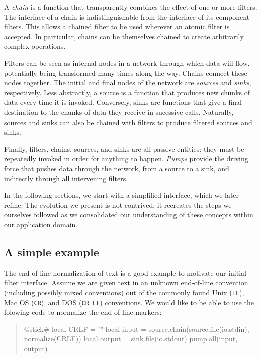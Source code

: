 \documentclass[10pt]{article}
\newcommand{\CR}{\texttt{CR}}
\newcommand{\LF}{\texttt{LF}}
\newcommand{\CRLF}{\texttt{CR~LF}}
\begin{document}
A \emph{chain} is a function that transparently combines the
effect of one or more filters. The interface of a chain is
indistinguishable from the interface of its component
filters.  This  allows a chained filter to be used wherever
an atomic filter is accepted. In particular, chains can be
themselves chained to create arbitrarily complex operations.

Filters can be seen as internal nodes in a network through
which data will flow, potentially being transformed many
times along the way.  Chains connect these nodes together.
The initial and final nodes of the network are
\emph{sources} and \emph{sinks}, respectively.  Less
abstractly, a source is a function that produces new chunks
of data every time it is invoked.  Conversely, sinks are
functions that give a final destination to the chunks of
data they receive in sucessive calls.  Naturally, sources
and sinks can also be chained with filters to produce
filtered sources and sinks.

Finally, filters, chains, sources, and sinks are all passive
entities: they must be repeatedly invoked in order for
anything to happen.  \emph{Pumps} provide the driving force
that pushes data through the network, from a source to a
sink, and indirectly through all intervening filters.

In the following sections, we start with a simplified
interface, which we later refine. The evolution we present
is not contrived: it recreates the steps we ourselves
followed as we consolidated our understanding of these
concepts within our application domain.

\subsection{A simple example}

The end-of-line normalization of text is a good
example to motivate our initial filter interface.
Assume we are given text in an unknown end-of-line
convention (including possibly mixed conventions) out of the
commonly found Unix (\LF), Mac OS (\CR), and
DOS (\CRLF) conventions. We would like to be able to
use the folowing code to normalize the end-of-line markers:
\begin{quote}
\begin{lua}
@stick#
local CRLF = ""
local input = source.chain(source.file(io.stdin), normalize(CRLF))
local output = sink.file(io.stdout)
pump.all(input, output)
%
\end{lua}
\end{quote}
\end{document}
